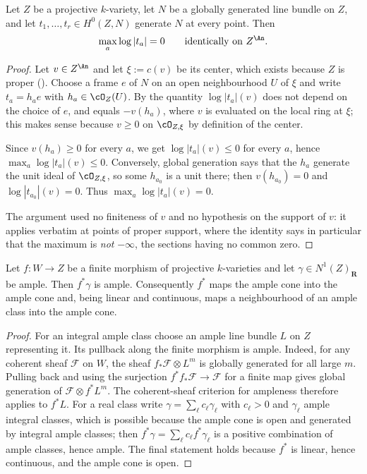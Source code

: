 \begin{lemma}
\label{lem:ch43-zero-fs}
Let $Z$ be a projective $k$-variety, let $N$ be a globally generated
line bundle on $Z$, and let $t_1,\ldots,t_r\in H^0(Z,N)$ generate $N$
at every point.  Then
\[
 \max_a\log|t_a|=0
 \qquad\text{identically on }Z^{\An}.
\]
\end{lemma}

\begin{proof}
Let $v\in Z^{\An}$ and let $\xi:=c(v)$ be its center, which exists
because $Z$ is proper ().  Choose a frame
$e$ of $N$ on an open neighbourhood $U$ of $\xi$ and write
$t_a=h_ae$ with $h_a\in\cO_Z(U)$.  By
 the quantity $\log|t_a|(v)$ does not
depend on the choice of $e$, and equals $-v(h_a)$, where $v$ is
evaluated on the local ring at $\xi$; this makes sense because
$v\ge0$ on $\cO_{Z,\xi}$ by definition of the center.

Since $v(h_a)\ge0$ for every $a$, we get $\log|t_a|(v)\le0$ for every
$a$, hence $\max_a\log|t_a|(v)\le0$.  Conversely, global generation says
that the $h_a$ generate the unit ideal of $\cO_{Z,\xi}$, so some
$h_{a_0}$ is a unit there; then $v(h_{a_0})=0$ and
$\log|t_{a_0}|(v)=0$.  Thus $\max_a\log|t_a|(v)=0$.

The argument used no finiteness of $v$ and no hypothesis on the support of
$v$: it applies verbatim at points of proper support, where the identity
says in particular that the maximum is \emph{not} $-\infty$, the
sections having no common zero.
\end{proof}

\begin{lemma}
\label{lem:ch43-ample-pullback}
Let $f:W\to Z$ be a finite morphism of projective $k$-varieties and let
$\gamma\in N^1(Z)_{\mathbf R}$ be ample.  Then $f^*\gamma$ is ample.
Consequently $f^*$ maps the ample cone into the ample cone and, being
linear and continuous, maps a neighbourhood of an ample class into the ample
cone.
\end{lemma}

\begin{proof}
For an integral ample class choose an ample line bundle $L$ on $Z$
representing it.  Its pullback along the finite morphism is ample.
Indeed, for any coherent sheaf $\mathcal F$ on $W$, the sheaf
$f_*\mathcal F\otimes L^m$ is globally generated for all large $m$.
Pulling back and using the surjection $f^*f_*\mathcal F\to\mathcal F$
for a finite map gives global generation of
$\mathcal F\otimes f^*L^m$.  The coherent-sheaf criterion for ampleness
therefore applies to $f^*L$.  For a real class
write $\gamma=\sum_\ell c_\ell\gamma_\ell$ with $c_\ell>0$ and
$\gamma_\ell$ ample integral classes, which is possible because the ample
cone is open and generated by integral ample classes; then
$f^*\gamma=\sum_\ell c_\ell f^*\gamma_\ell$ is a positive combination of
ample classes, hence ample.  The final statement holds because $f^*$ is
linear, hence continuous, and the ample cone is open.
\end{proof}

